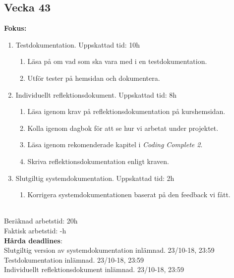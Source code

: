 \documentclass{TDP003mall}
\begin{document}
\subsection{Vecka 43}
\textbf{Fokus:}
\begin{enumerate}
    \item Testdokumentation. Uppskattad tid: 10h
    \begin{enumerate}
        \item Läsa på om vad som ska vara med i en testdokumentation.
        \item Utför tester på hemsidan och dokumentera.
    \end{enumerate}
    \item Individuellt reflektionsdokument. Uppskattad tid: 8h
    \begin{enumerate}
        \item Läsa igenom krav på reflektionsdokumentation på kurshemsidan.
        \item Kolla igenom dagbok för att se hur vi arbetat under projektet.
        \item Läsa igenom rekomenderade kapitel i \textit{Coding Complete 2}.
        \item Skriva reflektionsdokumentation enligt kraven.
    \end{enumerate}
    \item Slutgiltig systemdokumentation. Uppskattad tid: 2h
    \begin{enumerate}
        \item Korrigera systemdokumentationen baserat på den feedback vi fått.
    \end{enumerate}
\end{enumerate}
\\
Beräknad arbetstid: 20h\\
Faktisk arbetstid: -h\\

\textbf{Hårda deadlines}:\\
Slutgiltig version av systemdokumentation inlämnad. 23/10-18, 23:59\\
Testdokumentation inlämnad. 23/10-18, 23:59\\
Individuellt reflektionsdokument inlämnad. 23/10-18, 23:59
\end{document}
